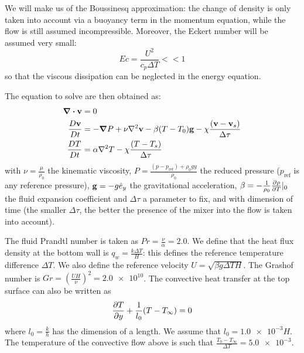 \documentclass[a4paper,10pt]{scrartcl}
\newcommand\matder[1]{\frac{D#1}{Dt}}
\begin{document}
We will make us of the Boussinesq approximation: the change of density is only taken into account via a buoyancy term in the momentum equation, while the flow is still assumed incompressible. Moreover, the Eckert number will be assumed very small:
\begin{equation} Ec = \frac{U^2}{c_p\Delta T} << 1 \end{equation}
so that the viscous dissipation can be neglected in the energy equation.

The equation to solve are then obtained as:
\begin{align}
        \div\vb{v} &= 0 \label{eq:tosolve1}\\
        \matder{\vb{v}} &= -\grad P + \nu\laplacian\vb{v} - \beta(T-T_0)\vb{g} - \chi\frac{(\vb{v}-\vb{v}_s)}{\Delta \tau} \label{eq:tosolve2}\\
        \matder{T} &= \alpha\laplacian T - \chi\frac{(T-T_s)}{\Delta \tau} \label{eq:tosolve3}
\end{align}
with $\nu = \frac{\mu}{\rho_0}$ the kinematic viscosity, $P=\frac{(p-p_\mathrm{ref})+\rho_0gy}{\rho_0}$ the reduced pressure ($p_\mathrm{ref}$ is any reference pressure), $\vb{g} = -g\hat{e}_y$ the gravitational acceleration, $\beta = -\frac{1}{\rho_0}\pdv{\rho}{T}\rvert_0$ the fluid expansion coefficient and $\Delta\tau$ a parameter to fix, and with dimension of time (the smaller $\Delta\tau$, the better the presence of the mixer into the flow is taken into account).

The fluid Prandtl number is taken as $Pr = \frac{\nu}{\alpha} = 2.0$. We define that the heat flux density at the bottom wall is $q_w = \frac{k\Delta T}{H}$: this defines the reference temperature difference $\Delta T$. We also define the reference velocity $U=\sqrt{\beta g\Delta TH}$. The Grashof number is $Gr = \left(\frac{UH}{\nu}\right)^2 = \num{2.0e10}$. The convective heat transfer at the top surface can also be written as
\begin{equation} \pdv{T}{y} + \frac{1}{l_0}(T-T_\infty) = 0 \end{equation}
where $l_0 = \frac{k}{h}$ has the dimension of a length. We assume that $l_0 = \num{1.0e-3}H$. The temperature of the convective flow above is such that $\frac{T_0-T_\infty}{\Delta T} = \num{5.0e-3}$.
\end{document}
